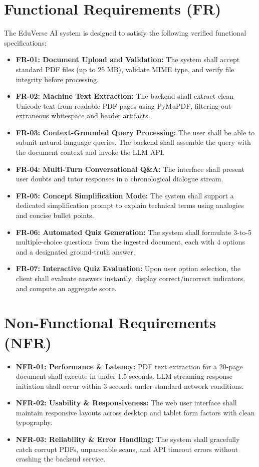 \documentclass[11pt,a4paper]{report}
\begin{document}
\section{Functional Requirements (FR)}
The EduVerse AI system is designed to satisfy the following verified functional specifications:
\begin{itemize}[noitemsep, topsep=2pt]
    \item \textbf{FR-01: Document Upload and Validation:} The system shall accept standard PDF files (up to 25 MB), validate MIME type, and verify file integrity before processing.
    \item \textbf{FR-02: Machine Text Extraction:} The backend shall extract clean Unicode text from readable PDF pages using PyMuPDF, filtering out extraneous whitespace and header artifacts.
    \item \textbf{FR-03: Context-Grounded Query Processing:} The user shall be able to submit natural-language queries. The backend shall assemble the query with the document context and invoke the LLM API.
    \item \textbf{FR-04: Multi-Turn Conversational Q\&A:} The interface shall present user doubts and tutor responses in a chronological dialogue stream.
    \item \textbf{FR-05: Concept Simplification Mode:} The system shall support a dedicated simplification prompt to explain technical terms using analogies and concise bullet points.
    \item \textbf{FR-06: Automated Quiz Generation:} The system shall formulate 3-to-5 multiple-choice questions from the ingested document, each with 4 options and a designated ground-truth answer.
    \item \textbf{FR-07: Interactive Quiz Evaluation:} Upon user option selection, the client shall evaluate answers instantly, display correct/incorrect indicators, and compute an aggregate score.
\end{itemize}

\section{Non-Functional Requirements (NFR)}
\begin{itemize}[noitemsep, topsep=2pt]
    \item \textbf{NFR-01: Performance \& Latency:} PDF text extraction for a 20-page document shall execute in under 1.5 seconds. LLM streaming response initiation shall occur within 3 seconds under standard network conditions.
    \item \textbf{NFR-02: Usability \& Responsiveness:} The web user interface shall maintain responsive layouts across desktop and tablet form factors with clean typography.
    \item \textbf{NFR-03: Reliability \& Error Handling:} The system shall gracefully catch corrupt PDFs, unparseable scans, and API timeout errors without crashing the backend service.
\end{itemize}
\end{document}
